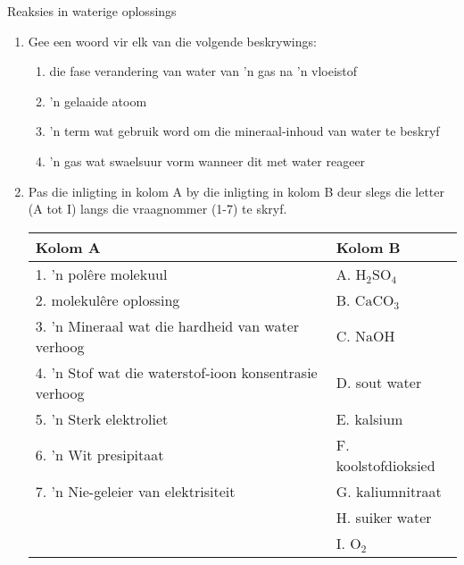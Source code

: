 \label{m38719*eip-896}
            \begin{eocexercises}{Reaksies in waterige oplossings}
            \nopagebreak
            \label{m38719*id342869}\begin{enumerate}[noitemsep, label=\textbf{\arabic*}. ] 
            \label{m38719*uid107}\item Gee een woord vir elk van die volgende beskrywings:
\label{m38719*id342885}\begin{enumerate}[noitemsep, label=\textbf{\alph*}. ] 
            \label{m38719*uid108}\item die fase verandering van water van 'n gas na 'n vloeistof
\label{m38719*uid109}\item 'n gelaaide atoom
\label{m38719*uid110}\item 'n term wat gebruik word om die mineraal-inhoud van water te beskryf
\label{m38719*uid111}\item 'n gas wat swaelsuur vorm wanneer dit met water reageer
\end{enumerate}
\label{m38719*uid112}\item Pas die inligting in kolom A by die inligting in kolom B deur slegs die letter (A tot I) langs die vraagnommer (1-7) te skryf.
          \begin{table}[H]
        \begin{center}
      \label{m38719*id342952}
    \noindent
      \begin{tabular}{|l|l|}\hline
        \textbf{Kolom A} &
        \textbf{Kolom B} \\ \hline
        1. 'n pol\^{e}re molekuul &
        A. ${\text{H}}_{2}{\text{SO}}_{4}$ \\ \hline
        2. molekul\^{e}re oplossing &
        B. ${\text{CaCO}}_{3}$ \\ \hline
        3.  'n Mineraal wat die hardheid van water verhoog &
        C. $\text{NaOH}$ \\ \hline
        4.   'n Stof wat die waterstof-ioon konsentrasie verhoog &
        D. sout water \\ \hline
        5.  'n Sterk elektroliet &
        E. kalsium \\ \hline
        6.  'n Wit presipitaat &
        F. koolstofdioksied \\ \hline
        7. 'n Nie-geleier van elektrisiteit &
        G. kaliumnitraat \\ \hline
         &
        H. suiker water \\ \hline
         &
        I. ${\text{O}}_{2}$ \\ \hline
    \end{tabular}
      \end{center}
\end{table}
    \par


\end{enumerate}
\end{eocexercises}
